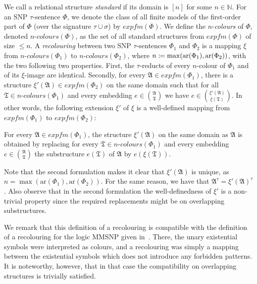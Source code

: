 \documentclass[oneside,reqno,12pt]{amsart}
\theoremstyle{plain}
\theoremstyle{remark}
\renewcommand{\coloneqq}{\mathrel{\mathop:}\mathrel{\mkern-1.2mu}=}
\newcommand{\struct}[1]{\mathfrak{#1}}
\newcommand{\efm}{\ensuremath{\mathit{expfm}}\xspace}
\newcommand{\colours}{\ensuremath{n\text{-}\mathit{colours}}}
\newcommand{\ar}{\ensuremath{\mathrm{ar}}\xspace}
\begin{document}
{We call a relational structure \emph{standard} if its domain is $[n]$ for some $n\in \mathbb{N}$.
For an SNP $\tau$-sentence $\Phi$, we denote the class of all finite models of the first-order part of $\Phi$  (over the signature $\tau\cup \sigma$) by $\efm(\Phi)$.    
We define the $n$-\emph{colours} of $\Phi$, denoted $\colours(\Phi)$, as the set of all standard structures from $\efm(\Phi)$ of size $\leq n$.
A \emph{recolouring} between two SNP $\tau$-sentences $\Phi_1$ and $\Phi_2$ is a mapping $\xi$ from $\colours(\Phi_1)$ to $\colours(\Phi_2)$, where $n\coloneqq \max(\ar(\Phi_1),\ar(\Phi_2))$, with the two following two properties.
First, the $\tau$-reducts of every $n$-colour of $\Phi_1$ and of its $\xi$-image are identical.
Secondly, for every $\struct A\in \efm(\Phi_1)$, there is a structure $\xi'(\struct A)\in \efm(\Phi_2)$ on the same domain such that for all $\struct{T} \in \colours(\Phi_1)$ and every embedding $e\in \binom{\struct{A}}{\struct{T}}$ we have $e\in \binom{\xi'(\struct{A})}{\xi(\struct{T})}$. 
In other words, the following  extension $\xi'$ of $\xi$ is a well-defined mapping from $\efm(\Phi_1)$ to $\efm(\Phi_2)$: 
\begin{center} \vspace{0.75em}
    {\it \parbox{0.65\textwidth}{For every $\struct{A}\in \efm(\Phi_1)$, the structure $\xi'(\struct{A})$ on the same domain as $\struct{A}$ is obtained by replacing for every  $\struct{T} \in \colours(\Phi_1)$ and every embedding $e\in \binom{\struct{A}}{\struct{T}}$ the substructure $e(\struct{T})$ of $\struct A$ by $e(\xi(\struct{T}))$.}  
    } \vspace{0.75em}
\end{center} 

Note that the second formulation makes it clear that $\xi'(\struct A)$ is unique, as $n = \max(\ar(\Phi_1),\ar(\Phi_2))$.
For the same reason, we have that $\struct{A}^\tau = \xi'(\struct A)^\tau$.  
Also observe that in the second  formulation the well-definedness of $\xi'$ is a non-trivial property since the required replacements might be on overlapping substructures. 

We remark that this definition of a recolouring is compatible with the definition of a recolouring for the logic MMSNP given in~\cite{madelaine2010containment,bodirsky2018_article}.
There, the unary existential symbols were interpreted as colours, and a recolouring was simply a mapping between the existential symbols which does not introduce any forbidden patterns.
It is noteworthy, however, that in that case the compatibility on overlapping structures is trivially satisfied.
 

}
\end{document}
